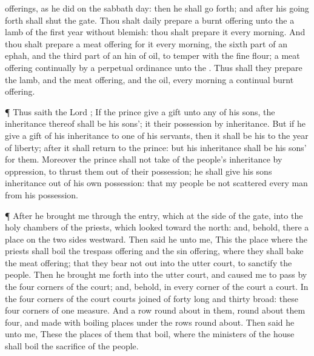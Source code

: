 {offerings, as he
did on the
sabbath
day: then he shall go
forth; and
after his going
forth
{} shall
shut the
gate.
Thou shalt
daily
prepare a burnt
offering unto the
{}
{} a
lamb of the
first
year without
blemish: thou shalt
prepare it
every
morning.
And thou shalt
prepare a meat
offering for it every
morning, the sixth
part of an
ephah, and the third
part of an
hin of
oil, to temper
with the fine
flour; a meat
offering
continually by a
perpetual
ordinance unto the
{}.
Thus shall they
prepare the
lamb, and the meat
offering, and the
oil, every
morning
{} a
continual burnt
offering.
\par }{\PP {}¶ Thus
saith the
Lord
{}; If the
prince
give a
gift unto
any of his
sons, the
inheritance thereof shall be his
sons’; it
{} their
possession by
inheritance.
But if he
give a
gift of his
inheritance to
one of his
servants, then it shall be his to the
year of
liberty; after it shall
return to the
prince: but his
inheritance shall be his
sons’ for them.
Moreover the
prince shall not
take of the
people’s
inheritance by
oppression, to
thrust them out of their
possession;
{} he shall give his
sons
inheritance out of his own
possession: that my
people be not
scattered every
man from his
possession.
\par }{\PP {}¶ After he
brought me through the
entry, which
{} at the
side of the
gate, into the
holy
chambers of the
priests, which
looked toward the
north: and, behold, there
{} a
place on the two
sides
westward.
Then
said he unto me, This
{} the
place where the
priests shall
boil the trespass
offering and the sin
offering, where they shall
bake the meat
offering; that they
bear
{} not out into the
utter
court, to
sanctify the
people.
Then he brought me
forth into the
utter
court, and caused me to pass
by the
four
corners of the
court; and, behold, in
every
corner of the
court
{} a
court.
In the
four
corners of the
court
{}
courts
joined of
forty
{}
long and
thirty
broad: these
four
corners
{} of
one
measure.
And
{} a
row
{} round
about in them, round
about them
four, and
{}
made with boiling
places under the
rows round
about.
Then
said he unto me, These
{} the
places of them that
boil, where the
ministers of the
house shall
boil the
sacrifice of the
people.

}
